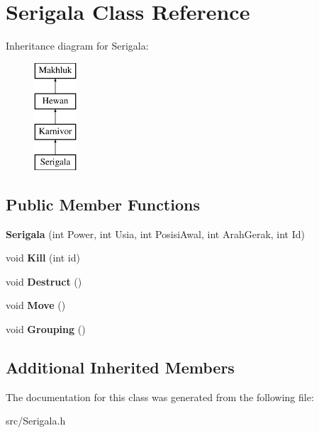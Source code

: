 \hypertarget{class_serigala}{}\section{Serigala Class Reference}
\label{class_serigala}
Inheritance diagram for Serigala\+:\begin{figure}[H]
\begin{center}
\leavevmode
\includegraphics[height=4.000000cm]{class_serigala}
\end{center}
\end{figure}
\subsection*{Public Member Functions}
\begin{DoxyCompactItemize}
\item 
\hypertarget{class_serigala_a2b9182e6082b38f5a345ffc4d0ca6c46}{}{\bfseries Serigala} (int Power, int Usia, int Posisi\+Awal, int Arah\+Gerak, int Id)\label{class_serigala_a2b9182e6082b38f5a345ffc4d0ca6c46}

\item 
\hypertarget{class_serigala_a079dec77b2b1d7988cc7f784e15970b3}{}void {\bfseries Kill} (int id)\label{class_serigala_a079dec77b2b1d7988cc7f784e15970b3}

\item 
\hypertarget{class_serigala_acd1fdf879d7050f699755dd5fc472740}{}void {\bfseries Destruct} ()\label{class_serigala_acd1fdf879d7050f699755dd5fc472740}

\item 
\hypertarget{class_serigala_a39a5f507c9ee63536d1e7ccede8e782f}{}void {\bfseries Move} ()\label{class_serigala_a39a5f507c9ee63536d1e7ccede8e782f}

\item 
\hypertarget{class_serigala_a5c3517dd807a41376731feaa38692ccc}{}void {\bfseries Grouping} ()\label{class_serigala_a5c3517dd807a41376731feaa38692ccc}

\end{DoxyCompactItemize}
\subsection*{Additional Inherited Members}


The documentation for this class was generated from the following file\+:\begin{DoxyCompactItemize}
\item 
src/Serigala.\+h\end{DoxyCompactItemize}
